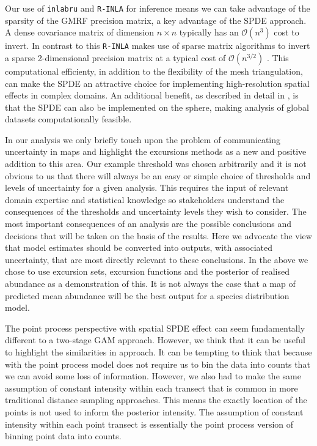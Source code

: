 \documentclass[preprint,12pt]{elsarticle}
\begin{document}
Our use of \texttt{inlabru} and \texttt{R-INLA} for inference means we can take advantage of the sparsity of the GMRF precision matrix, a key advantage of the SPDE approach.  A dense covariance matrix of dimension $n \times n$ typically has an $\mathcal{O}(n^3)$ cost to invert.  In contrast to this \texttt{R-INLA} makes use of sparse matrix algorithms to invert a sparse 2-dimensional precision matrix at a typical cost of $\mathcal{O}(n^{3/2})$ \citep{lindgren_explicit_2011}.  This computational efficienty, in addition to the flexibility of the mesh triangulation, can make the SPDE an attractive choice for implementing high-resolution spatial effects in complex domains.  An additional benefit, as described in detail in \cite{yuan_point_2017}, is that the SPDE can also be implemented on the sphere, making analysis of global datasets computationally feasible.

In our analysis we only briefly touch upon the problem of communicating uncertainty in maps and highlight the excursions methods as a new and positive addition to this area.  Our example threshold was chosen arbitrarily and it is not obvious to us that there will always be an easy or simple choice of thresholds and levels of uncertainty for a given analysis.  This requires the input of relevant domain expertise and statistical knowledge so stakeholders understand the consequences of the thresholds and uncertainty levels they wish to consider.  The most important consequences of an analysis are the possible conclusions and decisions that will be taken on the basis of the results.  Here we advocate the view that model estimates should be converted into outputs, with associated uncertainty, that are most directly relevant to these conclusions.  In the above we chose to use excursion sets, excursion functions and the posterior of realised abundance as a demonstration of this.  It is not always the case that a map of predicted mean abundance will be the best output for a species distribution model.  

The point process perspective with spatial SPDE effect can seem fundamentally different to a two-stage GAM approach.  However, we think that it can be useful to highlight the similarities in approach.  It can be tempting to think that because with the point process model does not require us to bin the data into counts that we can avoid some loss of information.  However, we also had to make the same assumption of constant intensity within each transect that is common in more traditional distance sampling approaches.  This means the exactly location of the points is not used to inform the posterior intensity.  The assumption of constant intensity within each point transect is essentially the point process version of binning point data into counts.
\end{document}
